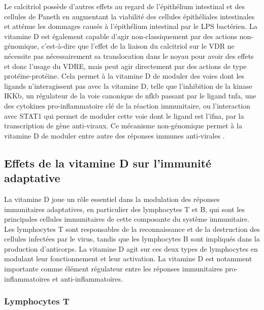 \documentclass[
  a4paper,
  DIV=11,
  numbers=noendperiod,
  listof=totoc]{scrreprt}
\begin{document}
Le calcitriol possède d'autres effets au regard de l'épithélium
intestinal et des cellules de Paneth en augmentant la viabilité des
cellules épithéliales intestinales et atténue les dommages causés à
l'épithélium intestinal par le \ac{LPS} bactérien. La vitamine D est
également capable d'agir non-classiquement par des actions
non-génomique, c'est-à-dire que l'effet de la liaison du calcitriol sur
le VDR ne nécessite pas nécessairement sa translocation dans le noyau
pour avoir des effets et donc l'usage du \ac{VDRE}, mais peut agir
directement par des actions de type protéine-protéine. Cela permet à la
vitamine D de moduler des voies dont les ligands n'interagissent pas
avec la vitamine D, telle que l'inhibition de la kinase \ac{IKKb}, un
régulateur de la voie canonique de \ac{nfkb} passant par le ligand
\ac{tnfa}, une des cytokines pro-inflammatoire clé de la réaction
immunitaire, ou l'interaction avec STAT1 qui permet de moduler cette
voie dont le ligand est l'\ac{ifna}, par la transcription de gène
anti-viraux. Ce mécanisme non-génomique permet à la vitamine D de
moduler entre autre des réponses immunes anti-virales \autocites[
]{Hii.2016}{Chen.2013.IKKb}.

\subsection{Effets de la vitamine D sur l'immunité
adaptative}\label{effets-de-la-vitamine-d-sur-limmunituxe9-adaptative}

La vitamine D joue un rôle essentiel dans la modulation des réponses
immunitaires adaptatives, en particulier des lymphocytes T et B, qui
sont les principales cellules immunitaires de cette composante du
système immunitaire. Les lymphocytes T sont responsables de la
reconnaissance et de la destruction des cellules infectées par le virus,
tandis que les lymphocytes B sont impliqués dans la production
d'anticorps. La vitamine D agit sur ces deux types de lymphocytes en
modulant leur fonctionnement et leur activation. La vitamine D est
notamment importante comme élément régulateur entre les réponses
immunitaires pro-inflammatoires et anti-inflammatoires.

\subsubsection{Lymphocytes T}\label{lymphocytes-t}
\end{document}
